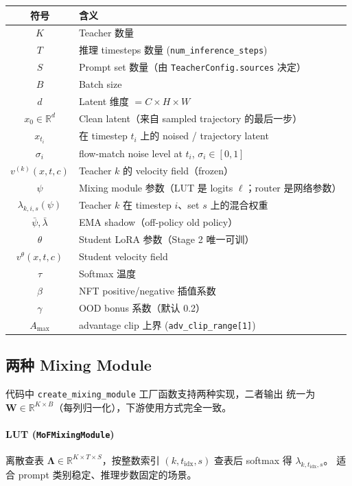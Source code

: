 \documentclass[11pt,a4paper]{article}
\newcommand{\R}{\mathbb{R}}
\theoremstyle{definition}
\begin{document}
\begin{center}
\renewcommand{\arraystretch}{1.3}
\begin{tabular}{cl}
\toprule
\textbf{符号} & \textbf{含义} \\
\midrule
$K$ & Teacher 数量 \\
$T$ & 推理 timesteps 数量 (\texttt{num\_inference\_steps}) \\
$S$ & Prompt set 数量（由 \texttt{TeacherConfig.sources} 决定） \\
$B$ & Batch size \\
$d$ & Latent 维度 $= C \times H \times W$ \\
$x_0 \in \R^d$ & Clean latent（来自 sampled trajectory 的最后一步） \\
$x_{t_i}$ & 在 timestep $t_i$ 上的 noised / trajectory latent \\
$\sigma_i$ & flow-match noise level at $t_i$, $\sigma_i \in [0, 1]$ \\
$v^{(k)}(x, t, c)$ & Teacher $k$ 的 velocity field（frozen）\\
$\psi$ & Mixing module 参数（LUT 是 logits $\ell$；router 是网络参数）\\
$\lambda_{k,i,s}(\psi)$ & Teacher $k$ 在 timestep $i$、set $s$ 上的混合权重 \\
$\bar{\psi}, \bar{\lambda}$ & EMA shadow（off-policy old policy）\\
$\theta$ & Student LoRA 参数（Stage 2 唯一可训）\\
$v^\theta(x, t, c)$ & Student velocity field \\
$\tau$ & Softmax 温度 \\
$\beta$ & NFT positive/negative 插值系数 \\
$\gamma$ & OOD bonus 系数（默认 0.2） \\
$A_{\max}$ & advantage clip 上界 (\texttt{adv\_clip\_range[1]}) \\
\bottomrule
\end{tabular}
\end{center}

\subsection{两种 Mixing Module}

代码中 \texttt{create\_mixing\_module} 工厂函数支持两种实现，二者输出
统一为 $\mathbf{W} \in \R^{K \times B}$（每列归一化），下游使用方式完全一致。

\paragraph{LUT (\texttt{MoFMixingModule})}
离散查表 $\bm{\Lambda} \in \R^{K \times T \times S}$，按整数索引
$(k, t_{\text{idx}}, s)$ 查表后 softmax 得 $\lambda_{k, t_{\text{idx}}, s}$。
适合 prompt 类别稳定、推理步数固定的场景。
\end{document}
